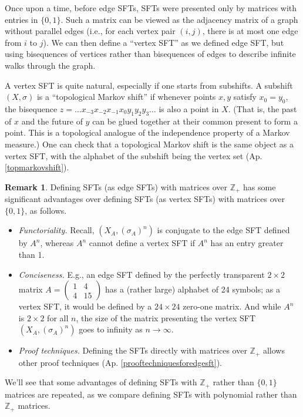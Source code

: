 \documentclass{amsart}
\theoremstyle{definition}
\newtheorem{rem}[equation]{Remark}
\theoremstyle{definition}
\newcommand{\apr}{(Ap. \ref}
\newcommand{\Z}{\mathbb Z}
\numberwithin{equation}{subsection}
\begin{document}
Once upon a time, before edge SFTs, SFTs were presented only by
matrices with entries in $\{0,1\}$.
Such a matrix can be viewed as the adjacency matrix of a graph
without parallel edges (i.e., for each vertex pair $(i,j)$,
there is  at most one edge from $i$ to $j$).
We can then define a ``vertex SFT'' as we defined edge SFT,
but using bisequences of vertices rather than bisequences
of edges to describe infinite walks through the graph.

A vertex SFT is quite natural,
especially if one starts from subshifts.
A subshift $(X, \sigma)$ is a ``topological Markov shift''
if whenever points $x,y$ satisfy $x_0=y_0$,  the bisequence
$z= \dots x_{-3}x_{-2}x_{-1}x_0y_1y_2y_3 \dots $
is also a point in
$X$. (That is, the past of $x$ and the future of $y$ can be glued
together at their common present
to form a point. This is a topological analogue of the
independence property of a Markov measure.)
One can check that   a topological Markov shift
is the same object as  a vertex SFT, with the
alphabet of the subshift being the vertex set
\apr{topmarkovshift}).

\begin{rem}
Defining  SFTs (as edge SFTs) with matrices over $\Z_+$
has some significant  advantages over defining SFTs (as vertex SFTs) with
matrices over $\{0,1\}$, as follows.
\begin{itemize}
\item
{\it Functoriality.}
Recall,
$(X_A, (\sigma_A)^n)$ is conjugate to the edge SFT defined by
$A^n$,  whereas $A^n$ cannot define a vertex
SFT if $A^n$ has an entry greater than 1.

\item
{\it Conciseness. }
E.g., an edge SFT defined by the perfectly transparent
$2\times 2 $ matrix
$ A= \begin{pmatrix} 1 & 4 \\ 4& 15 \end{pmatrix}$ has
a (rather large)  alphabet of 24 symbols;
as a vertex SFT, it would be defined by a $24 \times 24$
zero-one matrix. And while $A^n$ is $2\times 2$ for all $n$,
the size of the matrix presenting
the vertex SFT $(X_A, (\sigma_A)^n)$ goes to infinity as $n\to \infty$.

\item
{\it  Proof techniques.}  Defining the SFTs directly with matrices
over $\Z_+$ allows other proof techniques \apr{prooftechniquesforedgesft}).
\end{itemize}
\end{rem}
We'll see that some  advantages of
defining
SFTs with $\Z_+$ rather than $\{0,1\}$ matrices are repeated,
as we compare defining SFTs with polynomial rather than $\Z_+$
matrices.
\end{document}
